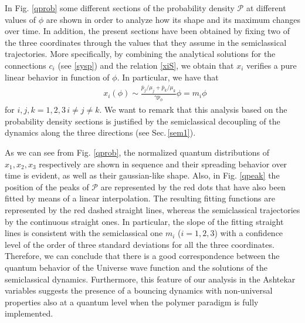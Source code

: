 \documentclass[aps,prd,twocolumn,nofootinbib,superscriptaddress]{revtex4-2}
\begin{document}
In Fig. \ref{qprob} some different sections of the probability density $\mathcal{P}$ at different values of $\phi$ are shown in order to analyze how its shape and its maximum changes over time. In addition, the present sections have been obtained by fixing two of the three coordinates through the values that they assume in the semiclassical trajectories. More specifically, by combining the analytical solutions for the connections $c_i$ (see \eqref{sysp}) and the relation \eqref{xiS}, we obtain that $x_i$ verifies a pure linear behavior in function of $\phi$. In particular, we have that
\begin{equation}
	\begin{aligned}
&x_i(\phi)\sim\frac{\bar{p}_j/\mu_j+\bar{p}_k/\mu_k}{\gamma p_\phi}\phi=m_i\phi\,
\end{aligned}
\end{equation}
for $i,j,k=1,2,3\,i\neq j\neq k$. We want to remark that this analysis based on the probability density sections is justified by the semiclassical decoupling of the dynamics along the three directions (see Sec.$\,$\ref{sem1}).

As we can see from Fig. \ref{qprob}, the normalized quantum distributions of $x_1,x_2,x_3$ respectively are shown in sequence and their spreading behavior over time is evident, as well as their gaussian-like shape. Also, in Fig. \ref{qpeak} the position of the peaks of $\mathcal{P}$ are represented by the red dots that have also been fitted by means of a linear interpolation. The resulting fitting functions are represented by the red dashed straight lines, whereas the semiclassical trajectories by the continuous straight ones. In particular, the slope of the fitting straight lines is consistent with the semiclassical one $m_i$ ($i=1,2,3$) with a confidence level of the order of three standard deviations for all the three coordinates. Therefore, we can conclude that there is a good correspondence between the quantum behavior of the Universe wave function and the solutions of the semiclassical dynamics. Furthermore, this feature of our analysis in the Ashtekar variables suggests the presence of a bouncing dynamics with non-universal properties also at a quantum level when the polymer paradigm is fully implemented. 
\end{document}
